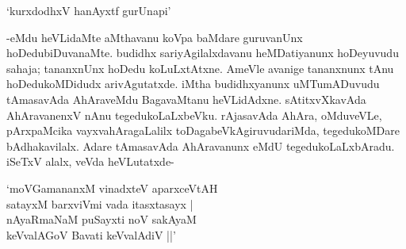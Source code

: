 \begin{shloka}
`kurxdodhxV hanAyxtf gurUnapi'
\end{shloka}

-eMdu heVLidaMte aMthavanu koVpa baMdare guruvanUnx hoDedubiDuvanaMte. budidhx sariyAgilalxdavanu heMDatiyanunx hoDeyuvudu sahaja; tananxnUnx hoDedu koLuLxtAtxne. AmeVle avanige tananxnunx tAnu hoDedukoMDidudx arivAgutatxde. iMtha budidhxyanunx uMTumADuvudu tAmasavAda AhAraveMdu BagavaMtanu heVLidAdxne. sAtitxvXkavAda AhAravanenxV nAnu tegedukoLaLxbeVku. rAjasavAda AhAra, oMduveVLe, pArxpaMcika vayxvahAragaLalilx toDagabeVkAgiruvudariMda, tegedukoMDare bAdhakavilalx. Adare tAmasavAda AhAravanunx eMdU tegedukoLaLxbAradu. iSeTxV alalx, veVda heVLutatxde-

\begin{shloka}
`moVGamananxM vinadxteV aparxceVtAH\\
satayxM barxviVmi vada itasxtasayx |\\
nAyaRmaNaM puSayxti noV sakAyaM\\
keVvalAGoV Bavati keVvalAdiV ||'
\end{shloka}

